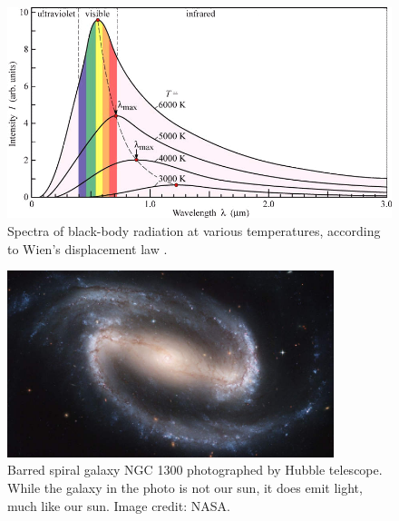 \begin{refsection}
\begin{rotatepage}
\begin{figure}
    \centering
    \includegraphics[width=\textwidth]{figures/sampleFig2.png}
    \caption[Black-body radiation ddd dddd dddd]{Spectra of black-body radiation at various temperatures, according to Wien's displacement law \cite{wannier1987statistical}.}
    \label{fig:secondFig}
\end{figure}
\end{rotatepage}

\begin{figure}[ht]
    \centering
	\includegraphics[width=0.85\textwidth]{figures/sampleFig1.jpg} 
	\caption[Barred spiral galaxy NGC 1300]{Barred spiral galaxy NGC 1300 photographed by Hubble telescope. While the galaxy in the photo is not our sun, it does emit light, much like our sun. Image credit: NASA.}
	\label{fig:firstFig}
\end{figure}



\clearpage

\printbibliography[heading=subbibintoc, title={\centering Notes}]
\end{refsection}